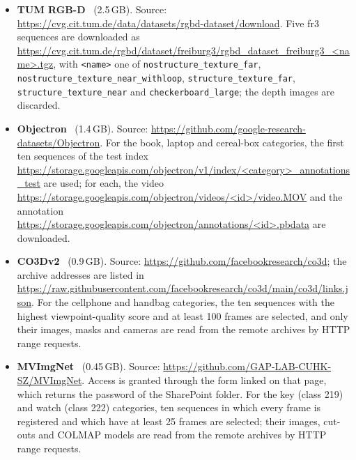 \documentclass[10pt,a4paper,twocolumn]{article}
\begin{document}
\begin{itemize}
  \item \textbf{TUM RGB-D}~\cite{tum} (2.5\,GB). Source: \url{https://cvg.cit.tum.de/data/datasets/rgbd-dataset/download}. Five fr3 sequences are downloaded as \url{https://cvg.cit.tum.de/rgbd/dataset/freiburg3/rgbd_dataset_freiburg3_<name>.tgz}, with \texttt{<name>} one of \texttt{nostructure\_texture\_far}, \texttt{nostructure\_texture\_near\_withloop}, \texttt{structure\_texture\_far}, \texttt{structure\_texture\_near} and \texttt{checkerboard\_large}; the depth images are discarded.
  \item \textbf{Objectron}~\cite{objectron} (1.4\,GB). Source: \url{https://github.com/google-research-datasets/Objectron}. For the book, laptop and cereal-box categories, the first ten sequences of the test index \url{https://storage.googleapis.com/objectron/v1/index/<category>_annotations_test} are used; for each, the video \url{https://storage.googleapis.com/objectron/videos/<id>/video.MOV} and the annotation \url{https://storage.googleapis.com/objectron/annotations/<id>.pbdata} are downloaded.
  \item \textbf{CO3Dv2}~\cite{co3d} (0.9\,GB). Source: \url{https://github.com/facebookresearch/co3d}; the archive addresses are listed in \url{https://raw.githubusercontent.com/facebookresearch/co3d/main/co3d/links.json}. For the cellphone and handbag categories, the ten sequences with the highest viewpoint-quality score and at least 100 frames are selected, and only their images, masks and cameras are read from the remote archives by HTTP range requests.
  \item \textbf{MVImgNet}~\cite{mvimgnet} (0.45\,GB). Source: \url{https://github.com/GAP-LAB-CUHK-SZ/MVImgNet}. Access is granted through the form linked on that page, which returns the password of the SharePoint folder. For the key (class 219) and watch (class 222) categories, ten sequences in which every frame is registered and which have at least 25 frames are selected; their images, cut-outs and COLMAP models are read from the remote archives by HTTP range requests.
\end{itemize}
\end{document}
